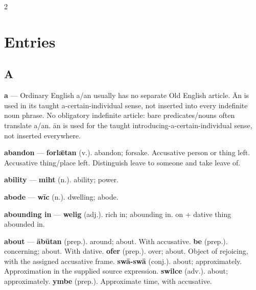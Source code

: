 \clearpage
\fontsize{10.5}{13.2}\selectfont
\setlength{\parskip}{4pt}
\begin{multicols}{2}
\section*{Entries}
\subsection*{A}
\textbf{a} — Ordinary English a/an usually has no separate Old English article. Ān is used in its taught a-certain-individual sense, not inserted into every indefinite noun phrase. No obligatory indefinite article: bare predicates/nouns often translate a/an. ān is used for the taught introducing-a-certain-individual sense, not inserted everywhere.\par
\textbf{abandon} — \textbf{forlǣtan} (v.). abandon; forsake. Accusative person or thing left. Accusative thing/place left. Distinguish leave to someone and take leave of.\par
\textbf{ability} — \textbf{miht} (n.). ability; power.\par
\textbf{abode} — \textbf{wīc} (n.). dwelling; abode.\par
\textbf{abounding in} — \textbf{welig} (adj.). rich in; abounding in. on + dative thing abounded in.\par
\textbf{about} — \textbf{ābūtan} (prep.). around; about. With accusative. \textbf{be} (prep.). concerning; about. With dative. \textbf{ofer} (prep.). over; about. Object of rejoicing, with the assigned accusative frame. \textbf{swā-swā} (conj.). about; approximately. Approximation in the supplied source expression. \textbf{swilce} (adv.). about; approximately. \textbf{ymbe} (prep.). Approximate time, with accusative.\par

\end{multicols}
